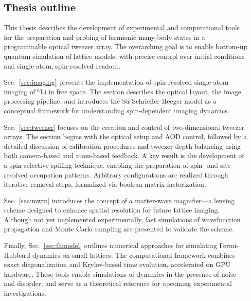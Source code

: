
\subsection{Thesis outline}

This thesis describes the development of experimental and computational tools for the preparation and probing of fermionic many-body states in a programmable optical tweezer array. The overarching goal is to enable bottom-up quantum simulation of lattice models, with precise control over initial conditions and single-atom, spin-resolved readout.

Sec.~\ref{sec:imaging} presents the implementation of spin-resolved single-atom imaging of $^6$Li in free space. The section describes the optical layout, the image processing pipeline, and introduces the Su-Schrieffer-Heeger model as a conceptual framework for understanding spin-dependent imaging dynamics.

Sec.~\ref{sec:tweezer} focuses on the creation and control of two-dimensional tweezer arrays. The section begins with the optical setup and AOD control, followed by a detailed discussion of calibration procedures and tweezer depth balancing using both camera-based and atom-based feedback. A key result is the development of a spin-selective spilling technique, enabling the preparation of spin- and site-resolved occupation patterns. Arbitrary configurations are realized through iterative removal steps, formalized via boolean matrix factorization.

Sec.~\ref{sec:mwm} introduces the concept of a matter-wave magnifier—a lensing scheme designed to enhance spatial resolution for future lattice imaging. Although not yet implemented experimentally, fast simulations of wavefunction propagation and Monte Carlo sampling are presented to validate the scheme.

Finally, Sec.~\ref{sec:fhmodel} outlines numerical approaches for simulating Fermi-Hubbard dynamics on small lattices. The computational framework combines exact diagonalization and Krylov-based time evolution, accelerated on GPU hardware. These tools enable simulations of dynamics in the presence of noise and disorder, and serve as a theoretical reference for upcoming experimental investigations.


